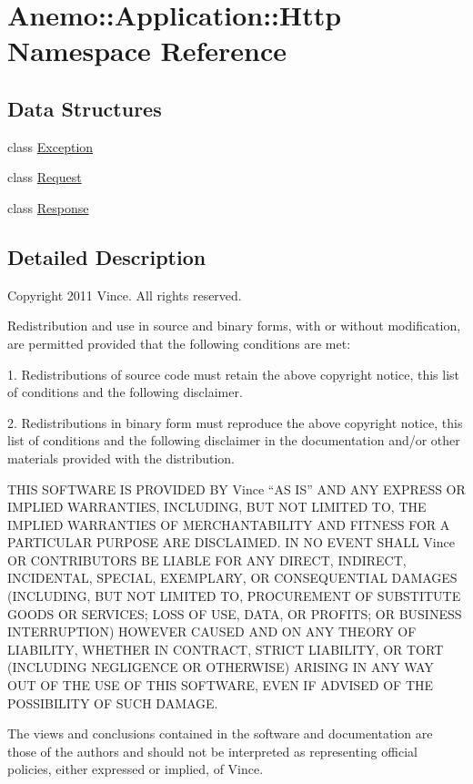 \hypertarget{namespace_anemo_1_1_application_1_1_http}{
\section{Anemo::Application::Http Namespace Reference}
\label{namespace_anemo_1_1_application_1_1_http}
}
\subsection*{Data Structures}
\begin{DoxyCompactItemize}
\item 
class \hyperlink{class_anemo_1_1_application_1_1_http_1_1_exception}{Exception}
\item 
class \hyperlink{class_anemo_1_1_application_1_1_http_1_1_request}{Request}
\item 
class \hyperlink{class_anemo_1_1_application_1_1_http_1_1_response}{Response}
\end{DoxyCompactItemize}


\subsection{Detailed Description}
Copyright 2011 Vince. All rights reserved.

Redistribution and use in source and binary forms, with or without modification, are permitted provided that the following conditions are met:

1. Redistributions of source code must retain the above copyright notice, this list of conditions and the following disclaimer.

2. Redistributions in binary form must reproduce the above copyright notice, this list of conditions and the following disclaimer in the documentation and/or other materials provided with the distribution.

THIS SOFTWARE IS PROVIDED BY Vince ``AS IS'' AND ANY EXPRESS OR IMPLIED WARRANTIES, INCLUDING, BUT NOT LIMITED TO, THE IMPLIED WARRANTIES OF MERCHANTABILITY AND FITNESS FOR A PARTICULAR PURPOSE ARE DISCLAIMED. IN NO EVENT SHALL Vince OR CONTRIBUTORS BE LIABLE FOR ANY DIRECT, INDIRECT, INCIDENTAL, SPECIAL, EXEMPLARY, OR CONSEQUENTIAL DAMAGES (INCLUDING, BUT NOT LIMITED TO, PROCUREMENT OF SUBSTITUTE GOODS OR SERVICES; LOSS OF USE, DATA, OR PROFITS; OR BUSINESS INTERRUPTION) HOWEVER CAUSED AND ON ANY THEORY OF LIABILITY, WHETHER IN CONTRACT, STRICT LIABILITY, OR TORT (INCLUDING NEGLIGENCE OR OTHERWISE) ARISING IN ANY WAY OUT OF THE USE OF THIS SOFTWARE, EVEN IF ADVISED OF THE POSSIBILITY OF SUCH DAMAGE.

The views and conclusions contained in the software and documentation are those of the authors and should not be interpreted as representing official policies, either expressed or implied, of Vince. 